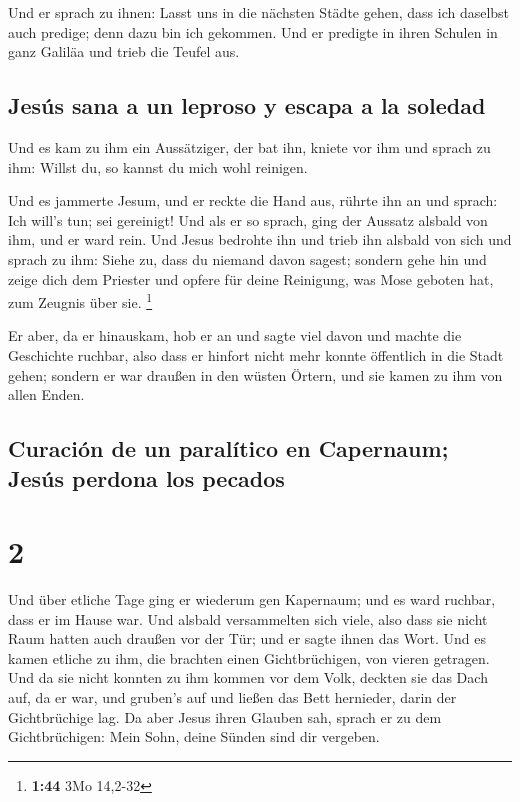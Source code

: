  Und er sprach zu ihnen: Lasst uns in die nächsten Städte
gehen, dass ich daselbst auch predige; denn dazu bin ich gekommen.
 Und er predigte in ihren Schulen in ganz Galiläa und
trieb die Teufel aus.

\hypertarget{jesuxfas-sana-a-un-leproso-y-escapa-a-la-soledad}{%
\subsection{Jesús sana a un leproso y escapa a la
soledad}\label{jesuxfas-sana-a-un-leproso-y-escapa-a-la-soledad}}

 Und es kam zu ihm ein Aussätziger, der bat ihn, kniete
vor ihm und sprach zu ihm: Willst du, so kannst du mich wohl reinigen.

 Und es jammerte Jesum, und er reckte die Hand aus,
rührte ihn an und sprach: Ich will's tun; sei gereinigt! 
Und als er so sprach, ging der Aussatz alsbald von ihm, und er ward
rein.  Und Jesus bedrohte ihn und trieb ihn alsbald von
sich  und sprach zu ihm: Siehe zu, dass du niemand davon
sagest; sondern gehe hin und zeige dich dem Priester und opfere für
deine Reinigung, was Mose geboten hat, zum Zeugnis über sie. \footnote{\textbf{1:44}
  3Mo 14,2-32}

 Er aber, da er hinauskam, hob er an und sagte viel davon
und machte die Geschichte ruchbar, also dass er hinfort nicht mehr
konnte öffentlich in die Stadt gehen; sondern er war draußen in den
wüsten Örtern, und sie kamen zu ihm von allen Enden.

\hypertarget{curaciuxf3n-de-un-paraluxedtico-en-capernaum-jesuxfas-perdona-los-pecados}{%
\subsection{Curación de un paralítico en Capernaum; Jesús perdona los
pecados}\label{curaciuxf3n-de-un-paraluxedtico-en-capernaum-jesuxfas-perdona-los-pecados}}

\hypertarget{section-1}{%
\section{2}\label{section-1}}

 Und über etliche Tage ging er wiederum gen Kapernaum; und
es ward ruchbar, dass er im Hause war.  Und alsbald
versammelten sich viele, also dass sie nicht Raum hatten auch draußen
vor der Tür; und er sagte ihnen das Wort.  Und es kamen
etliche zu ihm, die brachten einen Gichtbrüchigen, von vieren getragen.
 Und da sie nicht konnten zu ihm kommen vor dem Volk,
deckten sie das Dach auf, da er war, und gruben's auf und ließen das
Bett hernieder, darin der Gichtbrüchige lag.  Da aber
Jesus ihren Glauben sah, sprach er zu dem Gichtbrüchigen: Mein Sohn,
deine Sünden sind dir vergeben.


